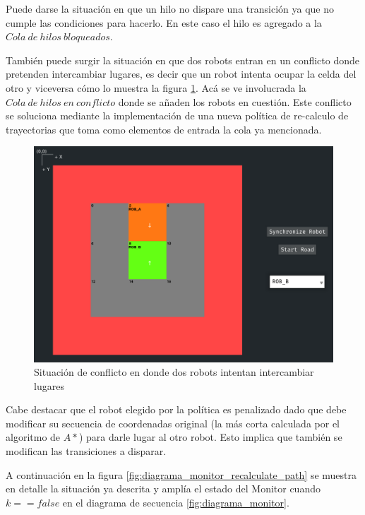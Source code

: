 Puede darse la situación en que un hilo no dispare una transición ya que no cumple las condiciones para hacerlo. En este caso el hilo es agregado a la $Cola\ de\ hilos\ bloqueados$.

También puede surgir la situación en que dos robots entran en un conflicto donde pretenden intercambiar lugares, es decir que un robot intenta ocupar la celda del otro y viceversa cómo lo muestra la figura \ref{fig:conflicto_path}. Acá se ve involucrada la $Cola\ de\ hilos\ en\ conflicto$ donde se añaden los robots en cuestión. Este conflicto se soluciona mediante la implementación de una nueva política de re-calculo de trayectorias que toma como elementos de entrada la cola ya mencionada.

\begin{figure}[H]
    \centering
    \includegraphics[trim={1.6cm 0.3cm 0 1.5cm}, clip, width=0.7\linewidth]{images/conflicto_path.png}
    \caption{Situación de conflicto en donde dos robots intentan intercambiar lugares}
    \label{fig:conflicto_path}
\end{figure}

Cabe destacar que el robot elegido por la política es penalizado dado que debe modificar su secuencia de coordenadas original (la más corta calculada por el algoritmo de $A*$) para darle lugar al otro robot. Esto implica que también se modifican las transiciones a disparar.

A continuación en la figura \ref{fig:diagrama_monitor_recalculate_path} se muestra en detalle la situación ya descrita y amplía el estado del Monitor cuando $k == false$ en el diagrama de secuencia \ref{fig:diagrama_monitor}.

